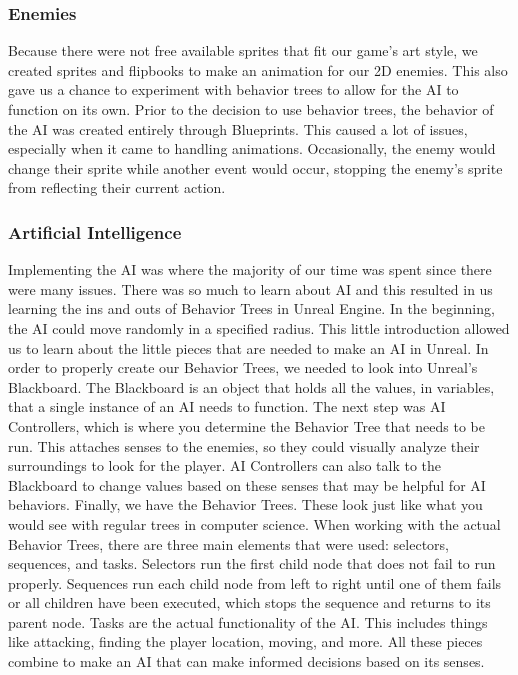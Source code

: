 \documentclass{sigchi}
\begin{document}
\subsubsection*{Enemies} Because there were not free available sprites that fit our game's art style, we created sprites and flipbooks to make an animation for our 2D enemies. This also gave us a chance to experiment with behavior trees to allow for the AI to function on its own. Prior to the decision to use behavior trees, the behavior of the AI was created entirely through Blueprints. This caused a lot of issues, especially when it came to handling animations. Occasionally, the enemy would change their sprite while another event would occur, stopping the enemy’s sprite from reflecting their current action. 

\subsubsection*{Artificial Intelligence} Implementing the AI was where the majority of our time was spent since there were many issues. There was so much to learn about AI and this resulted in us learning the ins and outs of Behavior Trees in Unreal Engine. In the beginning, the AI could move randomly in a specified radius. This little introduction allowed us to learn about the little pieces that are needed to make an AI in Unreal. In order to properly create our Behavior Trees, we needed to look into Unreal's Blackboard. The Blackboard is an object that holds all the values, in variables, that a single instance of an AI needs to function. The next step was AI Controllers, which is where you determine the Behavior Tree that needs to be run. This attaches senses to the enemies, so they could visually analyze their surroundings to look for the player. AI Controllers can also talk to the Blackboard to change values based on these senses that may be helpful for AI behaviors. Finally, we have the Behavior Trees. These look just like what you would see with regular trees in computer science. When working with the actual Behavior Trees, there are three main elements that were used: selectors, sequences, and tasks. Selectors run the first child node that does not fail to run properly. Sequences run each child node from left to right until one of them fails or all children have been executed, which stops the sequence and returns to its parent node. Tasks are the actual functionality of the AI. This includes things like attacking, finding the player location, moving, and more. All these pieces combine to make an AI that can make informed decisions based on its senses.
\end{document}
